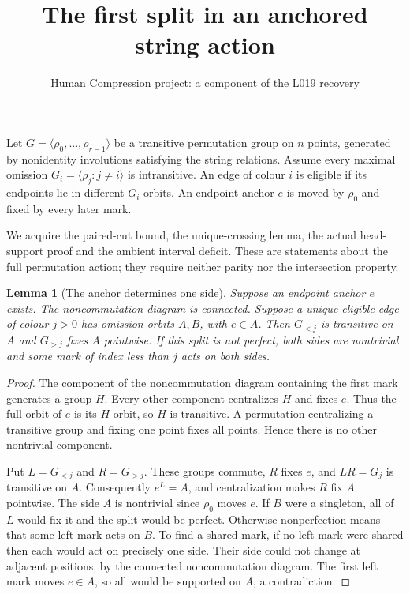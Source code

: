 \documentclass[11pt,a4paper]{article}
\title{The first split in an anchored string action}
\author{Human Compression project: a component of the L019 recovery}
\date{}
\newtheorem{lemma}{Lemma}\newtheorem{theorem}[lemma]{Theorem}
\newcommand{\gen}[1]{\langle#1\rangle}
\begin{document}
\maketitle
Let $G=\gen{\rho_0,\ldots,\rho_{r-1}}$ be a transitive
permutation group on $n$ points, generated by nonidentity
involutions satisfying the string relations. Assume every maximal
omission $G_i=\gen{\rho_j:j\ne i}$ is intransitive. An edge
of colour $i$ is eligible if its endpoints lie in different
$G_i$-orbits. An endpoint anchor $e$ is moved by $\rho_0$ and
fixed by every later mark.

We acquire the paired-cut bound, the unique-crossing lemma,
the actual head-support proof and the ambient interval deficit.
These are statements about the full permutation action; they
require neither parity nor the intersection property.

\begin{lemma}[The anchor determines one side]\label{anchor}
Suppose an endpoint anchor $e$ exists. The noncommutation
diagram is connected. Suppose a unique
eligible edge of colour $j>0$ has omission orbits $A,B$, with
$e\in A$. Then $G_{<j}$ is transitive on $A$ and $G_{>j}$
fixes $A$ pointwise. If this split is not perfect, both sides
are nontrivial and some mark of index less than $j$ acts on
both sides.
\end{lemma}
\begin{proof}
The component of the noncommutation diagram containing the
first mark generates a group $H$. Every other component
centralizes $H$ and fixes $e$. Thus the full orbit of $e$
is its $H$-orbit, so $H$ is transitive. A permutation
centralizing a transitive group and fixing one point fixes
all points. Hence there is no other nontrivial component.

Put $L=G_{<j}$ and $R=G_{>j}$. These groups commute, $R$
fixes $e$, and $LR=G_j$ is transitive on $A$. Consequently
$e^L=A$, and centralization makes $R$ fix $A$ pointwise.
The side $A$ is nontrivial since $\rho_0$ moves $e$.
If $B$ were a singleton, all of $L$ would fix it and the
split would be perfect. Otherwise nonperfection means that
some left mark acts on $B$. To find a shared mark, if no left mark
were shared then each would act on precisely one side.
Their side could not change at adjacent positions, by the
connected noncommutation diagram. The first left mark moves
$e\in A$, so all would be supported on $A$, a contradiction.
\end{proof}
\end{document}
